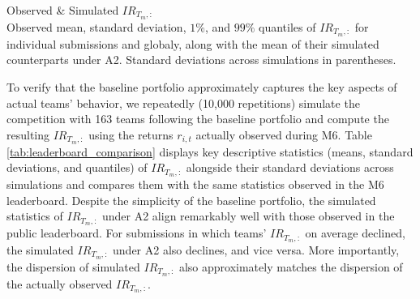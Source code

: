 \documentclass[3p,times,twocolumn]{elsarticle}
\begin{document}
\begin{table}[!htbp]
    \fontsize{5}{5}\selectfont
    \centering
    \caption{
        Observed \& Simulated $IR_{T_{m},:}$\\
        \footnotesize
        Observed mean, standard deviation, $1\%$, and $99\%$ quantiles of $IR_{T_{m},:}$ for individual submissions and globaly, along with the mean of their simulated counterparts under A2.
        Standard deviations across simulations in parentheses.
    }
    \label{tab:leaderboard_comparison}
\end{table}

To verify that the baseline portfolio approximately captures the key aspects of actual teams’ behavior, we repeatedly (10,000 repetitions) simulate the competition with 163 teams following the baseline portfolio and compute the resulting $IR_{T_{m},:}$ using the returns $r_{i,t}$ actually observed during M6.
Table \ref{tab:leaderboard_comparison} displays key descriptive statistics (means, standard deviations, and quantiles) of $IR_{T_{m},:}$ alongside their standard deviations across simulations and compares them with the same statistics observed in the M6 leaderboard. 
Despite the simplicity of the baseline portfolio, the simulated statistics of $IR_{T_{m},:}$ under A2 align remarkably well with those observed in the public leaderboard. 
For submissions in which teams' $IR_{T_{m},:}$ on average declined, the simulated $IR_{T_{m},:}$ under A2 also declines, and vice versa.
More importantly, the dispersion of simulated $IR_{T_{m},:}$ also approximately matches the dispersion of the actually observed $IR_{T_{m},:}$.
\end{document}
